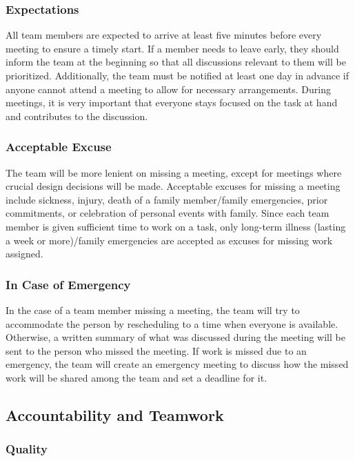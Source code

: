 \documentclass{article}
\begin{document}
\subsubsection*{Expectations}

All team members are expected to arrive at least five minutes before every meeting to ensure a timely start. If a member needs to leave early, they should inform the team at the beginning so that all discussions relevant to them will be prioritized. Additionally, the team must be notified at least one day in advance if anyone cannot attend a meeting to allow for necessary arrangements. During meetings, it is very important that everyone stays focused on the task at hand and contributes to the discussion.

\subsubsection*{Acceptable Excuse}

The team will be more lenient on missing a meeting, except for meetings where crucial design decisions will be made. Acceptable excuses for missing a meeting include sickness, injury, death of a family member/family emergencies, prior commitments, or celebration of personal events with family. Since each team member is given sufficient time to work on a task, only long-term illness (lasting a week or more)/family emergencies are accepted as excuses for missing work assigned.

\subsubsection*{In Case of Emergency}

In the case of a team member missing a meeting, the team will try to accommodate the person by rescheduling to a time when everyone is available. Otherwise, a written summary of what was discussed during the meeting will be sent to the person who missed the meeting. If work is missed due to an emergency, the team will create an emergency meeting to discuss how the missed work will be shared among the team and set a deadline for it.

\subsection*{Accountability and Teamwork}

\subsubsection*{Quality} 
\end{document}
